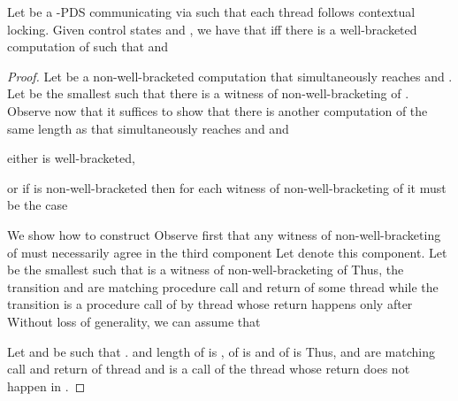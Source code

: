 \documentclass{LMCS}
\begin{document}
\begin{lemma}
Let
  be a -PDS communicating via  such that each thread follows contextual locking. Given control states  and , we have that
 iff there is a  well-bracketed computation  of 
such that  and 

\end{lemma}
\begin{proof}
Let  be a non-well-bracketed computation that simultaneously reaches  and .
Let  be the smallest  such that there is a witness  of non-well-bracketing of . Observe now that it suffices to show that there is another computation  of the same length as
 that simultaneously reaches  and  and
\begin{iteMize}{}
\item either  is well-bracketed,
\item or if  is non-well-bracketed then for each witness  of
  non-well-bracketing of  it must be the case 
\end{iteMize}

\noindent We show how to construct  Observe first that any witness  of non-well-bracketing of  must necessarily agree in the third component  Let 
denote this component.  Let  be the smallest
 such that  is a witness of non-well-bracketing of 
Thus, the transition  and 
are matching procedure call and return of some thread  while the transition  is a procedure call of  by thread  whose return happens only after  Without loss of generality, we can assume that 

Let  and  be such that
 .  and
length of  is , of  is  and
of  is  Thus,  and
 are matching call and return of thread  and
 is a call of the thread  whose return does not
happen in .


\end{proof}
\end{document}
